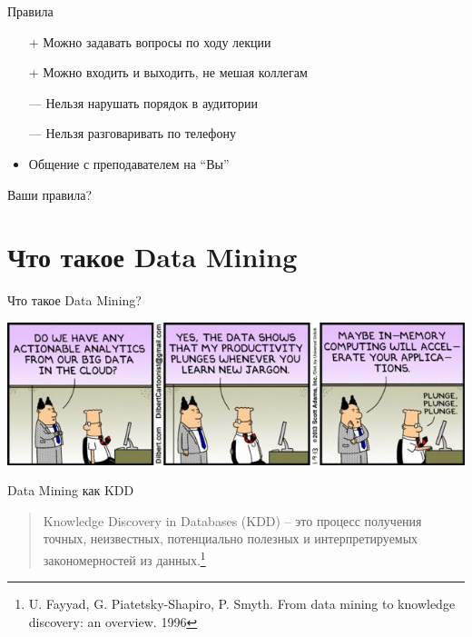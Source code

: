 \documentclass[aspectratio=169]{beamer}
\begin{document}
\begin{frame}{Правила}

\begin{itemize}
\item[+] Можно задавать вопросы по ходу лекции
\item[+] Можно входить и выходить, не мешая коллегам
\item[---] Нельзя нарушать порядок в аудитории
\item[---] Нельзя разговаривать по телефону
\item Общение с преподавателем на ``Вы''
\end{itemize}

Ваши правила?

\end{frame}

\section{Что такое Data Mining}

\begin{frame}{}

\begin{center}
{\LARGE Что такое Data Mining?}

\vspace{2em}
\includegraphics[scale=0.6]{images/joke1.jpg}
\end{center}

\end{frame}


\begin{frame}{Data Mining как KDD}

\begin{quote}{Knowledge Discovery in Databases (KDD)}
-- это процесс получения точных, неизвестных, потенциально полезных и интерпретируемых закономерностей из данных.\footnote{U. Fayyad, G. Piatetsky-Shapiro, P. Smyth. From data mining to knowledge discovery: an overview. 1996}
\end{quote}

\end{frame}
\end{document}
